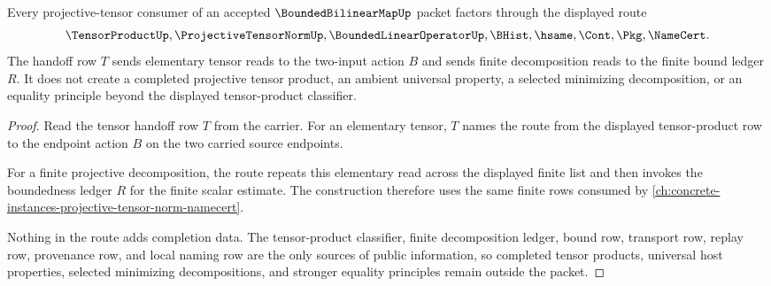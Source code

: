 \begin{theorem}
\label{thm:bounded-bilinear-map-projective-tensor-route}
Every projective-tensor consumer of an accepted $\BoundedBilinearMapUp$ packet factors through the displayed route
$$
\TensorProductUp,\ProjectiveTensorNormUp,\BoundedLinearOperatorUp,\BHist,\hsame,\Cont,\Pkg,\NameCert .
$$
The handoff row $T$ sends elementary tensor reads to the two-input action $B$ and sends finite decomposition reads to the finite bound ledger $R$. It does not create a completed projective tensor product, an ambient universal property, a selected minimizing decomposition, or an equality principle beyond the displayed tensor-product classifier.
\end{theorem}
\begin{proof}
Read the tensor handoff row $T$ from the carrier. For an elementary tensor, $T$ names the route from the displayed tensor-product row to the endpoint action $B$ on the two carried source endpoints.

For a finite projective decomposition, the route repeats this elementary read across the displayed finite list and then invokes the boundedness ledger $R$ for the finite scalar estimate. The construction therefore uses the same finite rows consumed by \autoref{ch:concrete-instances-projective-tensor-norm-namecert}.

Nothing in the route adds completion data. The tensor-product classifier, finite decomposition ledger, bound row, transport row, replay row, provenance row, and local naming row are the only sources of public information, so completed tensor products, universal host properties, selected minimizing decompositions, and stronger equality principles remain outside the packet.
\end{proof}

